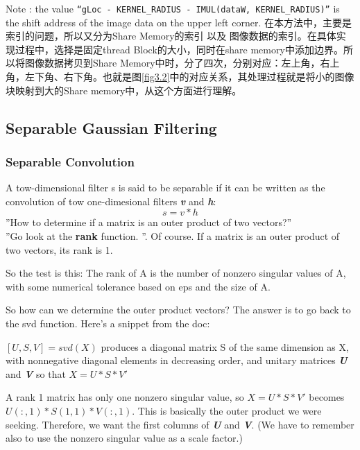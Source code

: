Note : the value \verb|“gLoc - KERNEL_RADIUS - IMUL(dataW, KERNEL_RADIUS)”| is the shift address of the image data on the upper left corner.
在本方法中，主要是索引的问题，所以又分为Share Memory的索引 以及 图像数据的索引。在具体实现过程中，选择是固定thread Block的大小，同时在share memory中添加边界。所以将图像数据拷贝到Share Memory中时，分了四次，分别对应：左上角，右上角，左下角、右下角。也就是图\ref{fig3.2}中的对应关系，其处理过程就是将小的图像块映射到大的Share memory中，从这个方面进行理解。

\subsection{Separable Gaussian Filtering}
\subsubsection{Separable Convolution}
A tow-dimensional filter s is said to be separable if it can be written as the convolution of tow one-dimesional filters \textit{\textbf{v}} and \textit{\textbf{h}}:
\begin{displaymath}
s = v * h
\end{displaymath}
''How to determine if a matrix is an outer product of two vectors?''\\
''Go look at the \textbf{rank} function. ''.
Of course. If a matrix is an outer product of two vectors, its rank is 1. 

So the test is this: The rank of A is the number of nonzero singular values of A, with some numerical tolerance based on eps and the size of A.

So how can we determine the outer product vectors? The answer is to go back to the svd function. Here's a snippet from the doc:

$[U, S, V] = svd(X)$ produces a diagonal matrix S of the same dimension as X, with nonnegative diagonal elements in decreasing order, and unitary matrices \textit{\textbf{U}} and \textit{\textbf{V}} so that
$X = U * S * V'$

A rank 1 matrix has only one nonzero singular value, so $X = U * S * V'$ becomes $U(:, 1) * S(1, 1) * V(:,1)$. This is basically the outer product we were seeking. Therefore, we want the first columns of \textit{\textbf{U}} and \textit{\textbf{V}}. (We have to remember also to use the nonzero singular value as a scale factor.)


